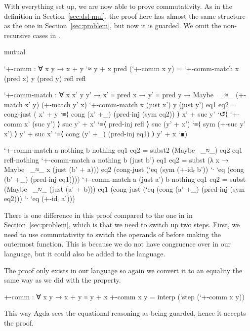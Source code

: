 With everything set up, we are now able to prove commutativity. As in the
definition in Section~\ref{sec:dsl-mul}, the proof here has almost the same
structure as the one in Section~\ref{sec:problem}, but now it is guarded. We
omit the non-recursive cases in .
\begin{code}[hide]
mutual
\end{code}
\begin{code}
  `+-comm : ∀ x y → x + y `≈ y + x
  pred (`+-comm x y) =
    `+-comm-match x (pred x) y (pred y) refl refl

  `+-comm-match :
    ∀ x x' y y' → x' ≡ pred x → y' ≡ pred y →
    Maybe~ _≈_ (+-match x' y) (+-match y' x)
  `+-comm-match x (just x') y (just y') eq1 eq2 =
    cong-just
      ( x' + y         `≡⟨ cong (x' +_) (pred-inj (sym eq2)) ⟩
        x' + suc y'    `↺⟨ `+-comm x' (suc y') ⟩
        suc y' + x'    `≡⟨ pred-inj refl ⟩
        suc (y' + x')  `≡⟨ sym (+-suc y' x') ⟩
        y' + suc x'    `≡⟨ cong (y' +_) (pred-inj eq1) ⟩
        y' + x         `∎)
\end{code}
\begin{code}[hide]
  `+-comm-match a nothing b nothing eq1 eq2 = subst2 (Maybe~ _≈_) eq2 eq1 refl-nothing
  `+-comm-match a nothing b (just b') eq1 eq2 = subst (λ x → Maybe~ _≈_ x (just (b' + a))) eq2 (cong-just (`eq (sym (+-idᵣ b')) `∙ `eq (cong (b' +_) (pred-inj eq1))))
  `+-comm-match a (just a') b nothing eq1 eq2 = subst (Maybe~ _≈_ (just (a' + b))) eq1 (cong-just (`eq (cong (a' +_) (pred-inj (sym eq2))) `∙ `eq (+-idᵣ a')))
\end{code}
There is one difference in this proof compared to the one in in
Section~\ref{sec:problem}, which is that we need to switch up two steps. First,
we need to use commutativity to switch the operands of \AgdaFunction{\_+\_}
before making  the outermost function. This is because we do
not have congruence over  in our language, but it could also
be added to the language.

The proof only exists in our language so again we convert it to an equality the
same way as we did with the  property.
\begin{code}
+-comm : ∀ x y → x + y ≡ y + x
+-comm x y = interp (`step (`+-comm x y))
\end{code}
This way Agda sees the equational reasoning as being guarded, hence it accepts
the proof.
